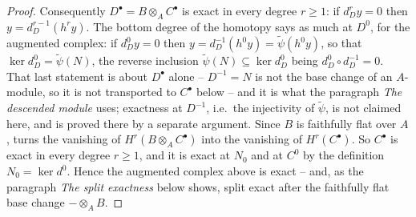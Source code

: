 \begin{proof}
Consequently $D^\bullet=B\otimes_AC^\bullet$ is exact in every degree
$r\ge1$: if $d^r_Dy=0$ then $y=d^{r-1}_D(h^ry)$.  The bottom degree of
the homotopy says as much at $D^0$, for the augmented complex: if
$d^0_Dy=0$ then $y=d^{-1}_D(h^0y)=\widetilde\psi(h^0y)$, so that
$\ker d^0_D=\widetilde\psi(N)$, the reverse inclusion
$\widetilde\psi(N)\subseteq\ker d^0_D$ being $d^0_D\circ d^{-1}_D=0$.
That last statement is about $D^\bullet$ alone -- $D^{-1}=N$ is not the
base change of an $A$-module, so it is not transported to $C^\bullet$
below -- and it is what the paragraph \emph{The descended module} uses;
exactness at $D^{-1}$, i.e.\ the injectivity of $\widetilde\psi$, is not
claimed here, and is proved there by a separate argument.  Since $B$ is
faithfully flat over $A$,  turns the
vanishing of $H^r(B\otimes_AC^\bullet)$ into the vanishing of
$H^r(C^\bullet)$.  So $C^\bullet$ is exact in every degree $r\ge1$,
and it is exact at $N_0$ and at $C^0$ by the definition $N_0=\ker d^0$.
Hence the augmented complex above is exact -- and, as the paragraph
\emph{The split exactness} below shows, split exact after the
faithfully flat base change $-\otimes_AB$.


\end{proof}
